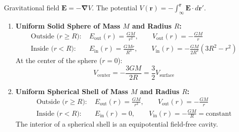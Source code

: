 \documentclass[10pt,twoside,openright]{book}
\begin{document}
\begin{formulabox}
Gravitational field $\mathbf{E} = -\boldsymbol{\nabla}V$. The potential $V(\mathbf{r}) = -\int_\infty^{\mathbf{r}} \mathbf{E}\cdot d\mathbf{r}'$.
\begin{enumerate}[leftmargin=*]
  \item \textbf{Uniform Solid Sphere of Mass $M$ and Radius $R$:}
  \begin{align}
    \text{Outside ($r \ge R$): } &E_{\text{out}}(r) = \frac{GM}{r^2}, \qquad V_{\text{out}}(r) = -\frac{GM}{r} \\
    \text{Inside ($r < R$): } &E_{\text{in}}(r) = \frac{GM r}{R^3}, \qquad V_{\text{in}}(r) = -\frac{GM}{2R^3}\left(3R^2 - r^2\right)
  \end{align}
  At the center of the sphere ($r = 0$):
  \begin{equation}
    V_{\text{center}} = -\frac{3GM}{2R} = \frac{3}{2}V_{\text{surface}}
  \end{equation}
  \item \textbf{Uniform Spherical Shell of Mass $M$ and Radius $R$:}
  \begin{align}
    \text{Outside ($r \ge R$): } &E_{\text{out}}(r) = \frac{GM}{r^2}, \qquad V_{\text{out}}(r) = -\frac{GM}{r} \\
    \text{Inside ($r < R$): } &E_{\text{in}}(r) = 0, \qquad V_{\text{in}}(r) = -\frac{GM}{R} = \text{constant}
  \end{align}
  The interior of a spherical shell is an equipotential field-free cavity.
\end{enumerate}
\end{formulabox}
\end{document}
